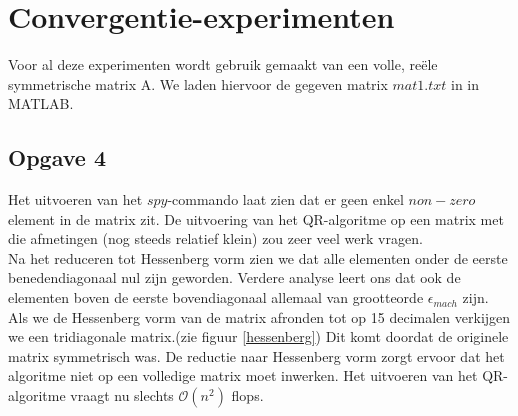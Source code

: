 \documentclass[a4paper, 12pt, titlepage]{report}
\begin{document}
\section{Convergentie-experimenten}
Voor al deze experimenten wordt gebruik gemaakt van een volle, re\"ele symmetrische matrix A. We laden hiervoor de gegeven matrix $mat1.txt$ in in MATLAB.

\subsection{Opgave 4}
Het uitvoeren van het $spy$-commando laat zien dat er geen enkel $non-zero$ element in de matrix zit. De uitvoering van het QR-algoritme op een matrix met die afmetingen (nog steeds relatief klein) zou zeer veel werk vragen. \\
Na het reduceren tot Hessenberg vorm zien we dat alle elementen onder de eerste benedendiagonaal nul zijn geworden. Verdere analyse leert ons dat ook de elementen boven de eerste bovendiagonaal allemaal van grootteorde $\epsilon_{mach}$ zijn. Als we de Hessenberg vorm van de matrix afronden tot op 15 decimalen verkijgen we een tridiagonale matrix.(zie figuur \ref{hessenberg}) Dit komt doordat de originele matrix symmetrisch was. De reductie naar Hessenberg vorm zorgt ervoor dat het algoritme niet op een volledige matrix moet inwerken. Het uitvoeren van het QR-algoritme vraagt nu slechts $\mathcal{O}(n^2)$ flops. 
\end{document}
